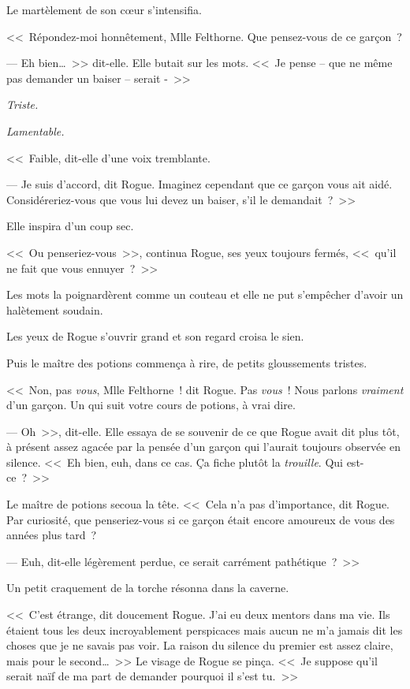 Le martèlement de son cœur s'intensifia.

<<~Répondez-moi honnêtement, Mlle Felthorne. Que pensez-vous de ce garçon~?

--- Eh bien…~>> dit-elle. Elle butait sur les mots. <<~Je pense -- que ne même pas demander un baiser -- serait -~>>

\emph{Triste.}

\emph{Lamentable.}

<<~Faible, dit-elle d'une voix tremblante.

--- Je suis d'accord, dit Rogue. Imaginez cependant que ce garçon vous ait aidé. Considéreriez-vous que vous lui devez un baiser, s'il le demandait~?~>>

Elle inspira d'un coup sec.

<<~Ou penseriez-vous~>>, continua Rogue, ses yeux toujours fermés, <<~qu'il ne fait que vous ennuyer~?~>>

Les mots la poignardèrent comme un couteau et elle ne put s'empêcher d'avoir un halètement soudain.

Les yeux de Rogue s'ouvrir grand et son regard croisa le sien.

Puis le maître des potions commença à rire, de petits gloussements tristes.

<<~Non, pas \emph{vous}, Mlle Felthorne~! dit Rogue. Pas \emph{vous}~! Nous parlons \emph{vraiment} d'un garçon. Un qui suit votre cours de potions, à vrai dire.

--- Oh~>>, dit-elle. Elle essaya de se souvenir de ce que Rogue avait dit plus tôt, à présent assez agacée par la pensée d'un garçon qui l'aurait toujours observée en silence. <<~Eh bien, euh, dans ce cas. Ça fiche plutôt la \emph{trouille}. Qui est-ce~?~>>

Le maître de potions secoua la tête. <<~Cela n'a pas d'importance, dit Rogue. Par curiosité, que penseriez-vous si ce garçon était encore amoureux de vous des années plus tard~?

--- Euh, dit-elle légèrement perdue, ce serait carrément pathétique~?~>>

Un petit craquement de la torche résonna dans la caverne.

<<~C'est étrange, dit doucement Rogue. J'ai eu deux mentors dans ma vie. Ils étaient tous les deux incroyablement perspicaces mais aucun ne m'a jamais dit les choses que je ne savais pas voir. La raison du silence du premier est assez claire, mais pour le second…~>> Le visage de Rogue se pinça. <<~Je suppose qu'il serait naïf de ma part de demander pourquoi il s'est tu.~>>

